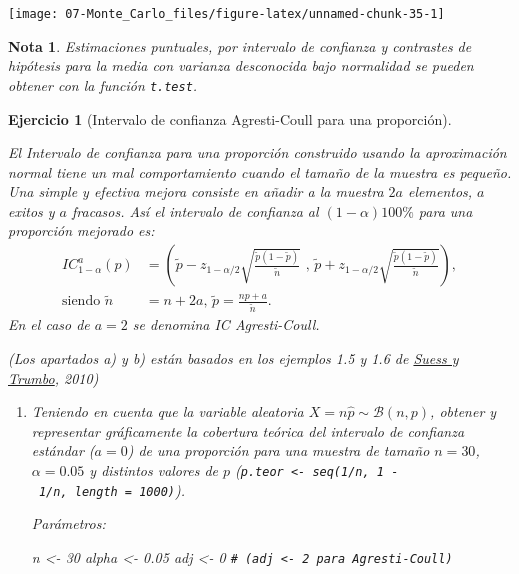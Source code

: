\documentclass[
]{book}
\newenvironment{Shaded}{\begin{snugshade}}{\end{snugshade}}
\newcommand{\CommentTok}[1]{\textcolor[rgb]{0.56,0.35,0.01}{\textit{#1}}}
\newcommand{\DecValTok}[1]{\textcolor[rgb]{0.00,0.00,0.81}{#1}}
\newcommand{\FloatTok}[1]{\textcolor[rgb]{0.00,0.00,0.81}{#1}}
\newcommand{\NormalTok}[1]{#1}
\newcommand{\OtherTok}[1]{\textcolor[rgb]{0.56,0.35,0.01}{#1}}
\theoremstyle{break}
\newtheorem{exercise}{Ejercicio}[chapter]
\theoremstyle{nonumberplain}
\newtheorem{remark}{Nota}
\renewcommand{\CommentTok}[1]{\textcolor[rgb]{0.41,0.41,0.41}{\texttt{#1}}}
\begin{document}
\begin{center}\texttt{[image: 07-Monte\_Carlo\_files/figure-latex/unnamed-chunk-35-1]} \end{center}

\begin{remark}
Estimaciones puntuales, por intervalo de confianza y contrastes de hipótesis
para la media con varianza desconocida bajo normalidad
se pueden obtener con la función \texttt{t.test}.
\end{remark}

\vspace{0.5cm}

\begin{exercise}[Intervalo de confianza Agresti-Coull para una proporción]
\protect\hypertarget{exr:ic-agresti-coull}{}\label{exr:ic-agresti-coull}

El Intervalo de confianza para una proporción construido usando la
aproximación normal tiene un mal comportamiento cuando el tamaño de
la muestra es pequeño. Una simple y efectiva mejora consiste en
añadir a la muestra \(2a\) elementos, \(a\) exitos y \(a\) fracasos. Así
el intervalo de confianza al \(\left( 1-\alpha\right) 100\%\) para
una proporción mejorado es:
\[\begin{aligned}
IC_{1-\alpha}^{a}\left(  p\right)   
& =\left(  \tilde{p}-z_{1-\alpha/2}\sqrt{\frac{\tilde{p}(1-\tilde{p})}{\tilde{n}}} \text{ , }
\tilde{p}+z_{1-\alpha/2}\sqrt{\frac{\tilde{p}(1-\tilde{p})}{\tilde{n}}}\right)  ,\\
\text{siendo }\tilde{n} & = n+2a \text{, } \tilde{p} = \frac{np+a}{\tilde{n}}.
\end{aligned}\]
En el caso de \(a=2\) se denomina IC Agresti-Coull.

(Los apartados a) y b) están basados en los ejemplos 1.5 y 1.6 de \href{http://www.springer.com/gp/book/9780387402734}{Suess y Trumbo}, 2010)

\begin{enumerate}
\def\labelenumi{\alph{enumi})}
\item
  Teniendo en cuenta que la variable aleatoria \(X=n\hat{p}\sim\mathcal{B}(n,p)\),
  obtener y representar gráficamente la cobertura teórica del
  intervalo de confianza estándar (\(a=0\)) de una proporción para
  una muestra de tamaño \(n=30\), \(\alpha=0.05\) y distintos valores
  de \(p\) (\texttt{p.teor\ \textless{}-\ seq(1/n,\ 1\ -\ 1/n,\ length\ =\ 1000)}).

  Parámetros:

\begin{Shaded}
\begin{Highlighting}[]
\NormalTok{n }\OtherTok{\textless{}{-}} \DecValTok{30}
\NormalTok{alpha }\OtherTok{\textless{}{-}} \FloatTok{0.05}
\NormalTok{adj }\OtherTok{\textless{}{-}} \DecValTok{0}  \CommentTok{\# (adj \textless{}{-} 2 para Agresti{-}Coull)}
\end{Highlighting}
\end{Shaded}


\end{enumerate}
\end{exercise}
\end{document}
